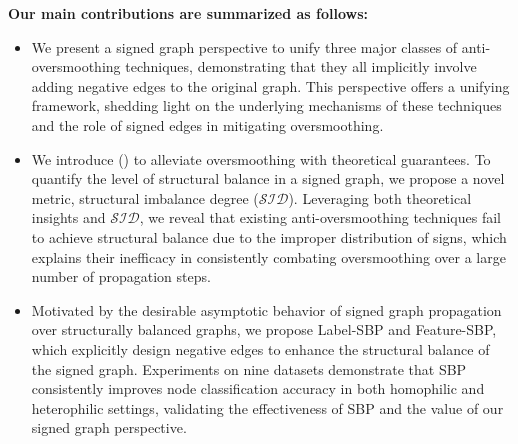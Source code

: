 \textbf{Our main contributions are summarized as follows:}
\begin{itemize}[leftmargin=1ex]
    \vspace{-2ex}
    \item We present a signed graph perspective to unify three major classes of anti-oversmoothing techniques, demonstrating that they all implicitly involve adding negative edges to the original graph. This perspective offers a unifying framework, shedding light on the underlying mechanisms of these techniques and the role of signed edges in mitigating oversmoothing. 
    \item We introduce \oursfull (\ours) to alleviate oversmoothing with theoretical guarantees. To quantify the level of structural balance in a signed graph, we propose a novel metric, structural imbalance degree (\(\mathcal{SID}\)). Leveraging both theoretical insights and \(\mathcal{SID}\), we reveal that existing anti-oversmoothing techniques fail to achieve structural balance due to the improper distribution of signs, which explains their inefficacy in consistently combating oversmoothing over a large number of propagation steps.
    \item Motivated by the desirable asymptotic behavior of signed graph propagation over structurally balanced graphs, we propose Label-SBP and Feature-SBP, which explicitly design negative edges to enhance the structural balance of the signed graph. Experiments on nine datasets demonstrate that SBP consistently improves node classification accuracy in both homophilic and heterophilic settings, validating the effectiveness of SBP and the value of our signed graph perspective.
\end{itemize}

